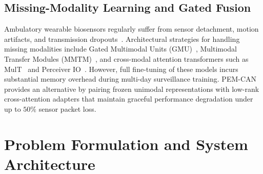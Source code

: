 \documentclass[journal,10pt,twocolumn]{IEEEtran}
\begin{document}
\subsection{Missing-Modality Learning and Gated Fusion}
Ambulatory wearable biosensors regularly suffer from sensor detachment, motion artifacts, and transmission dropouts~\cite{ma2023multimodal}. Architectural strategies for handling missing modalities include Gated Multimodal Units (GMU)~\cite{arevalo2017gmu}, Multimodal Transfer Modules (MMTM)~\cite{joze2020mmtm}, and cross-modal attention transformers such as MulT~\cite{tsai2019mult} and Perceiver IO~\cite{jaegle2021perceiver}. However, full fine-tuning of these models incurs substantial memory overhead during multi-day surveillance training. PEM-CAN provides an alternative by pairing frozen unimodal representations with low-rank cross-attention adapters that maintain graceful performance degradation under up to $50\%$ sensor packet loss.

\section{Problem Formulation and System Architecture}
\label{sec:architecture}
\end{document}
